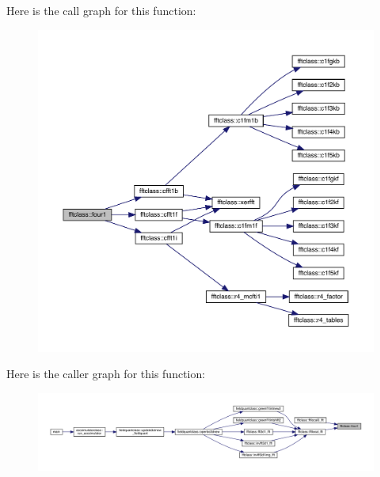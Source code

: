 Here is the call graph for this function\+:\nopagebreak
\begin{figure}[H]
\begin{center}
\leavevmode
\includegraphics[width=350pt]{namespacefftclass_a4597d420a1363f9fd0b652472d7caf52_cgraph}
\end{center}
\end{figure}
Here is the caller graph for this function\+:\nopagebreak
\begin{figure}[H]
\begin{center}
\leavevmode
\includegraphics[width=350pt]{namespacefftclass_a4597d420a1363f9fd0b652472d7caf52_icgraph}
\end{center}
\end{figure}
\mbox{\label{namespacefftclass_a21e8a7bd2877ec439bc4f0e0bc0e4681}} 
